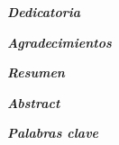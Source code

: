 



\thispagestyle{prefacepage}
{\large \textbf{\textit{Dedicatoria}}} 
\vspace{0.5cm} \\
\lorem{}

\blankpage{}

\thispagestyle{prefacepage}
{\large \textbf{\textit{Agradecimientos}}} 
\vspace{0.5cm} \\
\lorem{}

\blankpage{}

\thispagestyle{prefacepage}
{\large \textbf{\textit{Resumen}}} 
\vspace{0.5cm} \\
\lorem{}
\vspace{2cm}

{\large \textbf{\textit{Abstract}}} 
\vspace{0.5cm} \\
\lorem{}

\vspace{2cm}

{\large \textbf{\textit{Palabras clave}}} 
\vspace{0.5cm} \\
\lorem{}

\blankpage{}

%
%
%
%

